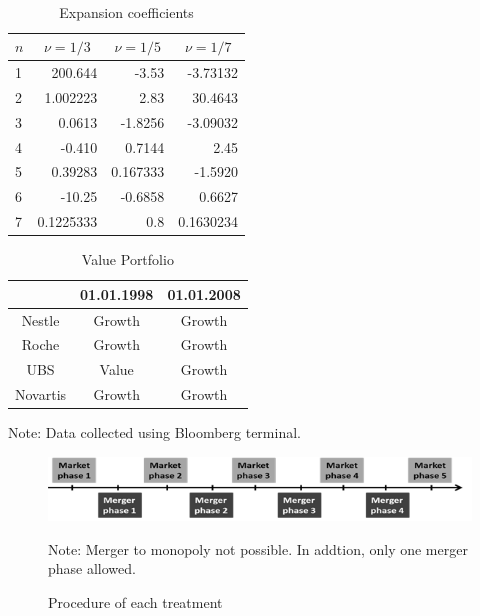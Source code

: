 \documentclass{article}
\newcommand\mc[1]{\multicolumn{1}{c}{#1}}
\begin{document}
\begin{table} [!h] \centering
	\caption{Expansion coefficients} \

	\begin{tabular}{@{} l *{3}{d{2.7}} @{}}
	\toprule
 	$n$ & \mc{$\nu=1/3$} & \mc{$\nu=1/5$} & \mc{$\nu=1/7$} \\
	 &         200.644 &         -3.53 &         -3.73132 \\
   	2 &          1.002223 &          2.83 &          30.4643\\
   	3 &          0.0613 &         -1.8256 &         -3.09032 \\
   	4 &         -0.410 &          0.7144 &          2.45 \\
  	5 &          0.39283 &          0.167333 &         -1.5920 \\
  	6 &         -10.25 &         -0.6858 &          0.6627 \\
  	7 &          0.1225333 &          0.8 &          0.1630234 \\
	\bottomrule
	\end{tabular}
\end{table}



\begin{table} [!h] \centering 
	\begin{threeparttable}
		\caption{Value Portfolio}
     	\begin{tabular}{ccc}
        	\toprule
				    	& 01.01.1998 & 01.01.2008\\ 
			\midrule
			Nestle  	& Growth 	& Growth \\
			Roche 		& Growth 	& Growth \\ 
			UBS 		& Value 	& Growth \\
			Novartis 	& Growth 	& Growth \\ 
			\bottomrule
		\end{tabular}
		\footnotesize Note: Data collected using Bloomberg terminal.
	\end{threeparttable}
\end{table}

\blindtext


\begin{figure} [!h]
	\caption{Procedure of each treatment}
 	\begin{centering}
		\includegraphics[width=0.8\linewidth]{phases} \\
	\end{centering}
	\footnotesize Note: Merger to monopoly not possible. In addtion, only one merger phase allowed. 
\end{figure}
\end{document}
